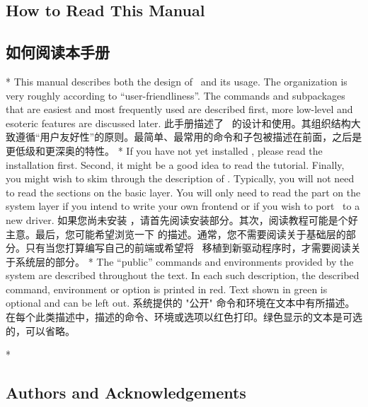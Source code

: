 \begin{paracol}{2}
\subsection{How to Read This Manual}
\switchcolumn
\subsection{如何阅读本手册}
\switchcolumn[0]*
This manual describes both the design of \tikzname\ and its usage. The
organization is very roughly according to ``user-friendliness''. The commands
and subpackages that are easiest and most frequently used are described first,
more low-level and esoteric features are discussed later.
\switchcolumn
此手册描述了 \tikzname\ 的设计和使用。其组织结构大致遵循“用户友好性”的原则。最简单、最常用的命令和子包被描述在前面，之后是更低级和更深奥的特性。
\switchcolumn[0]*
If you have not yet installed \tikzname, please read the installation first.
Second, it might be a good idea to read the tutorial. Finally, you might wish
to skim through the description of \tikzname. Typically, you will not need to
read the sections on the basic layer. You will only need to read the part on
the system layer if you intend to write your own frontend or if you wish to
port \pgfname\ to a new driver.
\switchcolumn
如果您尚未安装 \tikzname，请首先阅读安装部分。其次，阅读教程可能是个好主意。最后，您可能希望浏览一下 \tikzname 的描述。通常，您不需要阅读关于基础层的部分。只有当您打算编写自己的前端或希望将 \pgfname\ 移植到新驱动程序时，才需要阅读关于系统层的部分。
\switchcolumn[0]*
The ``public'' commands and environments provided by the system are described
throughout the text. In each such description, the described command,
environment or option is printed in red. Text shown in green is optional and
can be left out.
\switchcolumn
系统提供的 "公开" 命令和环境在文本中有所描述。在每个此类描述中，描述的命令、环境或选项以红色打印。绿色显示的文本是可选的，可以省略。

\switchcolumn[0]*
\subsection{Authors and Acknowledgements}
\label{section-authors}
\switchcolumn

\end{paracol}

